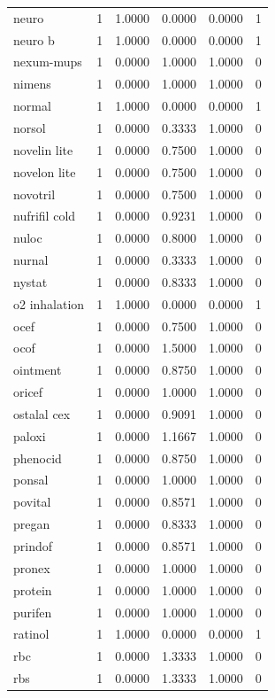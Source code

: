 \begin{longtable}{p{3.0cm}rrrrr}
neuro & 1 & 1.0000 & 0.0000 & 0.0000 & 1 \\
neuro b & 1 & 1.0000 & 0.0000 & 0.0000 & 1 \\
nexum-mups & 1 & 0.0000 & 1.0000 & 1.0000 & 0 \\
nimens & 1 & 0.0000 & 1.0000 & 1.0000 & 0 \\
normal & 1 & 1.0000 & 0.0000 & 0.0000 & 1 \\
norsol & 1 & 0.0000 & 0.3333 & 1.0000 & 0 \\
novelin lite & 1 & 0.0000 & 0.7500 & 1.0000 & 0 \\
novelon lite & 1 & 0.0000 & 0.7500 & 1.0000 & 0 \\
novotril & 1 & 0.0000 & 0.7500 & 1.0000 & 0 \\
nufrifil cold & 1 & 0.0000 & 0.9231 & 1.0000 & 0 \\
nuloc & 1 & 0.0000 & 0.8000 & 1.0000 & 0 \\
nurnal & 1 & 0.0000 & 0.3333 & 1.0000 & 0 \\
nystat & 1 & 0.0000 & 0.8333 & 1.0000 & 0 \\
o2 inhalation & 1 & 1.0000 & 0.0000 & 0.0000 & 1 \\
ocef & 1 & 0.0000 & 0.7500 & 1.0000 & 0 \\
ocof & 1 & 0.0000 & 1.5000 & 1.0000 & 0 \\
ointment & 1 & 0.0000 & 0.8750 & 1.0000 & 0 \\
oricef & 1 & 0.0000 & 1.0000 & 1.0000 & 0 \\
ostalal cex & 1 & 0.0000 & 0.9091 & 1.0000 & 0 \\
paloxi & 1 & 0.0000 & 1.1667 & 1.0000 & 0 \\
phenocid & 1 & 0.0000 & 0.8750 & 1.0000 & 0 \\
ponsal & 1 & 0.0000 & 1.0000 & 1.0000 & 0 \\
povital & 1 & 0.0000 & 0.8571 & 1.0000 & 0 \\
pregan & 1 & 0.0000 & 0.8333 & 1.0000 & 0 \\
prindof & 1 & 0.0000 & 0.8571 & 1.0000 & 0 \\
pronex & 1 & 0.0000 & 1.0000 & 1.0000 & 0 \\
protein & 1 & 0.0000 & 1.0000 & 1.0000 & 0 \\
purifen & 1 & 0.0000 & 1.0000 & 1.0000 & 0 \\
ratinol & 1 & 1.0000 & 0.0000 & 0.0000 & 1 \\
rbc & 1 & 0.0000 & 1.3333 & 1.0000 & 0 \\
rbs & 1 & 0.0000 & 1.3333 & 1.0000 & 0 \\

\end{longtable}
